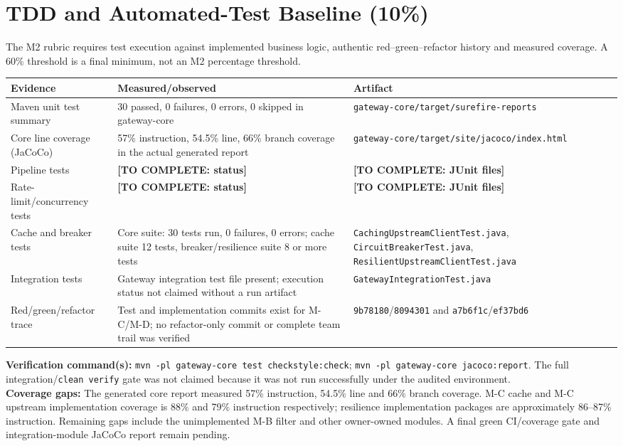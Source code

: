 \documentclass[12pt,a4paper]{article}
\newcommand{\todo}[1]{\textcolor{red!70!black}{\textbf{[TO COMPLETE: #1]}}}
\newcommand{\evidence}[1]{\texttt{#1}}
\begin{document}
\section{TDD and Automated-Test Baseline (10\%)}\label{sec:tdd}
The M2 rubric requires test execution against implemented business logic, authentic red--green--refactor history and measured coverage. A 60\% threshold is a final minimum, not an M2 percentage threshold.
\begin{longtable}{L{3.5cm} L{3.6cm} L{5.1cm}}\toprule
\textbf{Evidence} & \textbf{Measured/observed} & \textbf{Artifact}\\\midrule\endhead
Maven unit test summary & 30 passed, 0 failures, 0 errors, 0 skipped in gateway-core & \evidence{gateway-core/target/surefire-reports}\\
Core line coverage (JaCoCo) & 57\% instruction, 54.5\% line, 66\% branch coverage in the actual generated report & \evidence{gateway-core/target/site/jacoco/index.html}\\
Pipeline tests & \todo{status} & \todo{JUnit files}\\
Rate-limit/concurrency tests & \todo{status} & \todo{JUnit files}\\
Cache and breaker tests & Core suite: 30 tests run, 0 failures, 0 errors; cache suite 12 tests, breaker/resilience suite 8 or more tests & \evidence{CachingUpstreamClientTest.java}, \evidence{CircuitBreakerTest.java}, \evidence{ResilientUpstreamClientTest.java}\\
Integration tests & Gateway integration test file present; execution status not claimed without a run artifact & \evidence{GatewayIntegrationTest.java}\\
Red/green/refactor trace & Test and implementation commits exist for M-C/M-D; no refactor-only commit or complete team trail was verified & \texttt{9b78180}/\texttt{8094301} and \texttt{a7b6f1c}/\texttt{ef37bd6}\\\bottomrule\end{longtable}
\textbf{Verification command(s):} \texttt{mvn -pl gateway-core test checkstyle:check}; \texttt{mvn -pl gateway-core jacoco:report}. The full integration/\texttt{clean verify} gate was not claimed because it was not run successfully under the audited environment.\\
\textbf{Coverage gaps:} The generated core report measured 57\% instruction, 54.5\% line and 66\% branch coverage. M-C cache and M-C upstream implementation coverage is 88\% and 79\% instruction respectively; resilience implementation packages are approximately 86--87\% instruction. Remaining gaps include the unimplemented M-B filter and other owner-owned modules. A final green CI/coverage gate and integration-module JaCoCo report remain pending.
\end{document}
